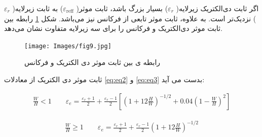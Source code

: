 اگر ثابت دی‌الکتریک زیرلایه(
$\varepsilon_r$)
بسیار بزرگ باشد، ثابت موثر(
$\varepsilon_{\text{reff}}$)
به ثابت زیرلایه(
$\varepsilon_{r}$)
نزدیک‌تر است. به علاوه، ثابت موثر تابعی از فرکانس نیز می‌باشد. شکل 
\ref{fig9}
 رابطه بین ثابت موثر دی‌الکتریک و فرکانس را برای سه زیرلایه متفاوت نشان می‌دهد.

\begin{figure}
	\centering
	\texttt{[image: Images/fig9.jpg]}
	\caption{رابطه ی بین ثابت موثر دی الکتریک و فرکانس}
	\label{fig9}
\end{figure}

ثابت موثر دی الکتریک از معادلات 
\ref{eq:eq2}
و
\ref{eq:eq3}
بدست می آید:

\begin{align}
 	\label{eq:eq2}
    \frac{W}{H} < 1	\qquad  \varepsilon_e = \frac{\varepsilon_r+1}{2} + \frac{\varepsilon_r-1}{2} \left[ \left(1+12\frac{H}{W}\right)^{-1/2} + 0.04 \left(1-\frac{W}{H}\right)^2 \right]
\end{align}


\begin{align}
	\label{eq:eq3}
    \frac{W}{H} \geq 1 \qquad \varepsilon_e = \frac{\varepsilon_r+1}{2} + \frac{\varepsilon_r-1}{2} \left(1+12\frac{H}{W}\right)^{-1/2} 
\end{align}



